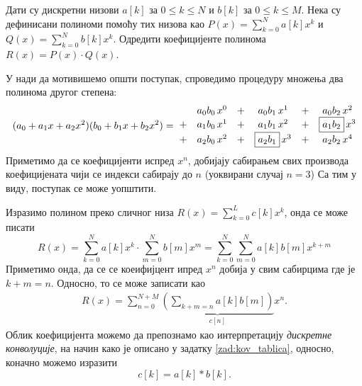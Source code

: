 \mnAdvanced \PID
Дати су дискретни низови $a[k]$ за $0 \leq k \leq N$ и $b[k]$ за $0 \leq k \leq M$. Нека су дефинисани полиноми 
помоћу тих низова као $P(x) = \sum_{k = 0}^{N} a[k] x^k$ и $Q(x) = \sum_{k = 0}^{N} b[k] x^k$. Одредити 
коефицијенте полинома $R(x) = P(x) \cdot Q(x)$.

\RESENJE

\noindent 

У нади да мотивишемо општи поступак, спроведимо процедуру множења два полинома другог степена: 
\begin{eqnarray}
    (a_0 + a_1 x + a_2 x^2) (b_0 + b_1 x + b_2 x^2) &=& \hspace*{-5mm}
    \begin{matrix}
        & & a_0b_0\, x^0  &+& a_0b_1\, x^1 &+& a_0b_2\, x^2 \\
        &+& a_1b_0\, x^1  &+& a_1b_1\, x^2 &+& \boxed{a_1b_2}\, x^3 \\
        &+& a_2b_0\, x^2  &+& \boxed{a_2b_1}\, x^3 &+& a_2b_2\, x^4 \\
    \end{matrix} 
\end{eqnarray}
Приметимо да се коефицијенти испред $x^n$, добијају сабирањем свих производа коефицијената чији се индекси сабирају до $n$ 
(уоквирани случај $n=3$)
Са тим у виду, поступак се може уопштити.

Изразимо полином преко сличног низа $R(x) = \sum_{k=0}^{L} c[k] x^k$, онда се може писати
\begin{equation}
    R(x) = \sum_{k = 0}^{N} a[k] x^k \cdot  \sum_{m = 0}^{N} b[m] x^m = \sum_{k = 0}^{N}  \sum_{m = 0}^{N} a[k]b[m] x^{k+m}
\end{equation}
Приметимо онда, да се се коеифијцент ипред $x^n$ добија у свим сабирцима где је $k+m=n$. Односно, то се може записати као 
\begin{eqnarray}
    R(x) = \sum_{n = 0}^{N+M} \underbrace{\left( \sum_{k + m = n} a[k]b[m] \right)}_{c[n]} x^n.
\end{eqnarray}
Облик коефицијента можемо да препознамо као интерпретацију \textit{дискретне конволуције}, на начин како је описано у задатку 
\ref{zad:kov_tablica}, односно, коначно можемо изразити 
\begin{equation}
    c[k] = a[k] \ast b[k].
\end{equation}